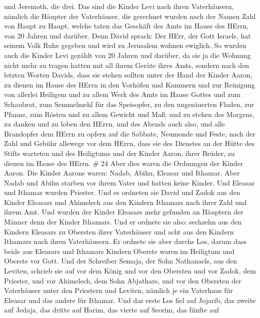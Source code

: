 und Jeremoth, die drei.  Das sind die Kinder Levi nach
ihren Vaterhäusern, nämlich die Häupter der Vaterhäuser, die gerechnet
wurden nach der Namen Zahl von Haupt zu Haupt, welche taten das Geschäft
des Amts im Hause des HErrn, von 20 Jahren und darüber. 
Denn David sprach: Der HErr, der Gott Israels, hat seinem Volk Ruhe
gegeben und wird zu Jerusalem wohnen ewiglich.  So wurden
auch die Kinder Levi gezählt von 20 Jahren und darüber, da sie ja die
Wohnung nicht mehr zu tragen hatten mit all ihrem Geräte ihres Amts,
 sondern nach den letzten Worten Davids,  dass
sie stehen sollten unter der Hand der Kinder Aaron, zu dienen im Hause
des HErrn in den Vorhöfen und Kammern und zur Reinigung von allerlei
Heiligem und zu allem Werk des Amts im Hause Gottes  und
zum Schaubrot, zum Semmelmehl für das Speisopfer, zu den ungesäuerten
Fladen, zur Pfanne, zum Rösten und zu allem Gewicht und Maß;
 und zu stehen des Morgens, zu danken und zu loben den
HErrn, und des Abends auch also,  und alle Brandopfer dem
HErrn zu opfern auf die Sabbate, Neumonde und Feste, nach der Zahl und
Gebühr allewege vor dem HErrn,  dass sie des Dienstes an
der Hütte des Stifts warteten und des Heiligtums und der Kinder Aaron,
ihrer Brüder, zu dienen im Hause des HErrn. \# 24  Aber dies
waren die Ordnungen der Kinder Aaron. Die Kinder Aarons waren: Nadab,
Abihu, Eleasar und Ithamar.  Aber Nadab und Abihu starben
vor ihrem Vater und hatten keine Kinder. Und Eleasar und Ithamar wurden
Priester.  Und es ordneten sie David und Zadok aus den
Kinder Eleasars und Ahimelech aus den Kindern Ithamars nach ihrer Zahl
und ihrem Amt.  Und wurden der Kinder Eleasars mehr gefunden
an Häuptern der Männer denn der Kinder Ithamars. Und er ordnete sie
also: sechzehn aus den Kindern Eleasars zu Obersten ihrer Vaterhäuser
und acht aus den Kindern Ithamars nach ihren Vaterhäusern. 
Er ordnete sie aber durchs Los, darum dass beide aus Eleasars und
Ithamars Kindern Oberste waren im Heiligtum und Oberste vor Gott.
 Und der Schreiber Semaja, der Sohn Nathanaels, aus den
Leviten, schrieb sie auf vor dem König und vor den Obersten und vor
Zadok, dem Priester, und vor Ahimelech, dem Sohn Abjathars, und vor den
Obersten der Vaterhäuser unter den Priestern und Leviten, nämlich je ein
Vaterhaus für Eleasar und das andere für Ithamar.  Und das
erste Los fiel auf Jojarib, das zweite auf Jedaja,  das
dritte auf Harim, das vierte auf Seorim,  das fünfte auf
